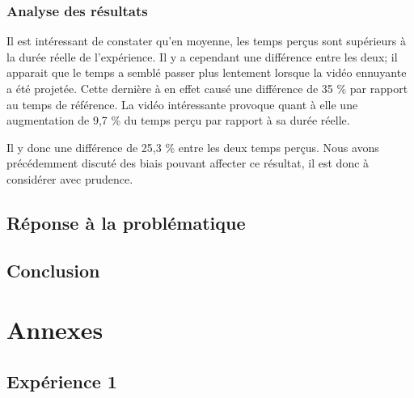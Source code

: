 \documentclass[12pt,fleqn,oneside,openany]{book} %
\begin{document}


\subsection{Analyse des résultats} \label{ssec:analyseResult}
Il est intéressant de constater qu'en moyenne, les temps perçus sont supérieurs à la durée réelle de l'expérience. Il y a cependant une différence entre les deux; il apparait que le temps a semblé passer plus lentement lorsque la vidéo ennuyante a été projetée. Cette dernière à en effet causé une différence de 35 \% par rapport au temps de référence. La vidéo intéressante provoque quant à elle une augmentation de 9,7 \% du temps perçu par rapport à sa durée réelle.

Il y donc une différence de 25,3 \% entre les deux temps perçus. Nous avons précédemment discuté des biais pouvant affecter ce résultat, il est donc à considérer avec prudence. 

\newpage
\section{Réponse à la problématique} \label{sec:reponseProb}

\newpage
\section{Conclusion} \label{sec:conclusion}




\appendix
\chapter{Annexes} \label{cha:annexes}
\section*{Expérience 1}
\end{document}
